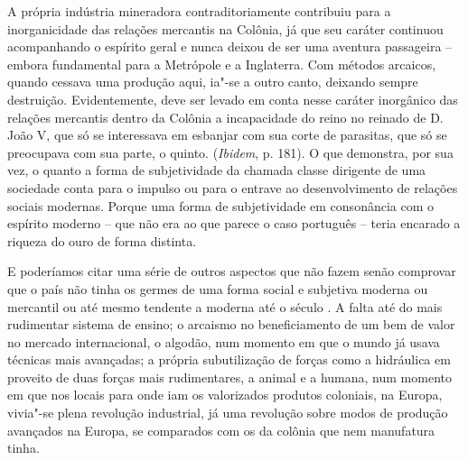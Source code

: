 {A própria indústria mineradora contraditoriamente contribuiu para a
inorganicidade das relações mercantis na Colônia, já que seu caráter
continuou acompanhando o espírito geral e nunca deixou de ser uma
aventura passageira -- embora fundamental para a Metrópole e a
Inglaterra. Com métodos arcaicos, quando cessava uma produção aqui,
ia"-se a outro canto, deixando sempre destruição. Evidentemente, deve ser
levado em conta nesse caráter inorgânico das relações mercantis dentro
da Colônia a incapacidade do reino no reinado de D. João V, que só se
interessava em esbanjar com sua corte de parasitas, que só se preocupava
com sua parte, o quinto. (\emph{Ibidem}, p. 181). O que demonstra, por
sua vez, o quanto a forma de subjetividade da chamada classe dirigente
de uma sociedade conta para o impulso ou para o entrave ao
desenvolvimento de relações sociais modernas. Porque uma forma de
subjetividade em consonância com o espírito moderno -- que não era ao
que parece o caso português -- teria encarado a riqueza do ouro de forma
distinta.

E poderíamos citar uma série de outros aspectos que não fazem senão
comprovar que o país não tinha os germes de uma forma social e subjetiva
moderna ou mercantil ou até mesmo tendente a moderna até o século . A
falta até do mais rudimentar sistema de ensino; o arcaismo no
beneficiamento de um bem de valor no mercado internacional, o algodão,
num momento em que o mundo já usava técnicas mais avançadas; a própria
subutilização de forças como a hidráulica em proveito de duas forças
mais rudimentares, a animal e a humana, num momento em que nos locais
para onde iam os valorizados produtos coloniais, na Europa, vivia"-se
plena revolução industrial, já uma revolução sobre modos de produção
avançados na Europa, se comparados com os da colônia que nem manufatura
tinha.

}
